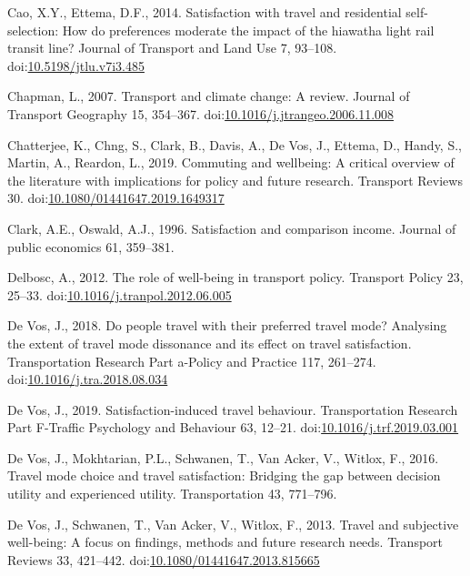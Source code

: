 \documentclass[]{elsarticle} %
\begin{document}
\leavevmode\hypertarget{ref-Cao2014satisfaction}{}%
Cao, X.Y., Ettema, D.F., 2014. Satisfaction with travel and residential
self-selection: How do preferences moderate the impact of the hiawatha
light rail transit line? Journal of Transport and Land Use 7, 93--108.
doi:\href{https://doi.org/10.5198/jtlu.v7i3.485}{10.5198/jtlu.v7i3.485}

\leavevmode\hypertarget{ref-Chapman2007transport}{}%
Chapman, L., 2007. Transport and climate change: A review. Journal of
Transport Geography 15, 354--367.
doi:\href{https://doi.org/10.1016/j.jtrangeo.2006.11.008}{10.1016/j.jtrangeo.2006.11.008}

\leavevmode\hypertarget{ref-Chatterjee2019commuting}{}%
Chatterjee, K., Chng, S., Clark, B., Davis, A., De Vos, J., Ettema, D.,
Handy, S., Martin, A., Reardon, L., 2019. Commuting and wellbeing: A
critical overview of the literature with implications for policy and
future research. Transport Reviews 30.
doi:\href{https://doi.org/10.1080/01441647.2019.1649317}{10.1080/01441647.2019.1649317}

\leavevmode\hypertarget{ref-Clark1996satisfaction}{}%
Clark, A.E., Oswald, A.J., 1996. Satisfaction and comparison income.
Journal of public economics 61, 359--381.

\leavevmode\hypertarget{ref-Delbosc2012role}{}%
Delbosc, A., 2012. The role of well-being in transport policy. Transport
Policy 23, 25--33.
doi:\href{https://doi.org/10.1016/j.tranpol.2012.06.005}{10.1016/j.tranpol.2012.06.005}

\leavevmode\hypertarget{ref-Devos2018people}{}%
De Vos, J., 2018. Do people travel with their preferred travel mode?
Analysing the extent of travel mode dissonance and its effect on travel
satisfaction. Transportation Research Part a-Policy and Practice 117,
261--274.
doi:\href{https://doi.org/10.1016/j.tra.2018.08.034}{10.1016/j.tra.2018.08.034}

\leavevmode\hypertarget{ref-Devos2019satisfaction}{}%
De Vos, J., 2019. Satisfaction-induced travel behaviour. Transportation
Research Part F-Traffic Psychology and Behaviour 63, 12--21.
doi:\href{https://doi.org/10.1016/j.trf.2019.03.001}{10.1016/j.trf.2019.03.001}

\leavevmode\hypertarget{ref-Devos2016travel}{}%
De Vos, J., Mokhtarian, P.L., Schwanen, T., Van Acker, V., Witlox, F.,
2016. Travel mode choice and travel satisfaction: Bridging the gap
between decision utility and experienced utility. Transportation 43,
771--796.

\leavevmode\hypertarget{ref-Devos2013travel}{}%
De Vos, J., Schwanen, T., Van Acker, V., Witlox, F., 2013. Travel and
subjective well-being: A focus on findings, methods and future research
needs. Transport Reviews 33, 421--442.
doi:\href{https://doi.org/10.1080/01441647.2013.815665}{10.1080/01441647.2013.815665}
\end{document}
